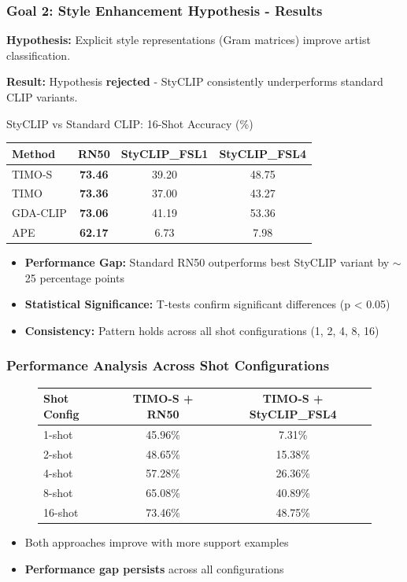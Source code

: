 \documentclass[aspectratio=169,xcolor=dvipsnames]{beamer}
\begin{document}
\begin{frame}
  \frametitle{Goal 2: Style Enhancement Hypothesis - Results}
  \textbf{Hypothesis:} Explicit style representations (Gram matrices) improve artist classification.
  
  \textbf{Result:} Hypothesis \textbf{rejected} - StyCLIP consistently underperforms standard CLIP variants.

  \begin{block}{StyCLIP vs Standard CLIP: 16-Shot Accuracy (\%)}
    \centering
    \tiny
    \begin{tabular}{@{}lccc@{}}
      \toprule
      \textbf{Method} & \textbf{RN50} & \textbf{StyCLIP\_FSL1} & \textbf{StyCLIP\_FSL4} \\
      \midrule
      TIMO-S    & \textbf{73.46} & 39.20 & 48.75 \\
      TIMO      & \textbf{73.36} & 37.00 & 43.27 \\
      GDA-CLIP  & \textbf{73.06} & 41.19 & 53.36 \\
      APE       & \textbf{62.17} & 6.73  & 7.98  \\
      \bottomrule
    \end{tabular}
    \normalsize
  \end{block}
  \begin{itemize}
    \item \textbf{Performance Gap:} Standard RN50 outperforms best StyCLIP variant by $\sim$25 percentage points
    \item \textbf{Statistical Significance:} T-tests confirm significant differences (p < 0.05)
    \item \textbf{Consistency:} Pattern holds across all shot configurations (1, 2, 4, 8, 16)
  \end{itemize}
\end{frame}

\begin{frame}
  \frametitle{Performance Analysis Across Shot Configurations}
  \begin{figure}[H]
    \centering
    \tiny
    \begin{tabular}{@{}lcc@{}}
      \toprule
      \textbf{Shot Config} & \textbf{TIMO-S + RN50} & \textbf{TIMO-S + StyCLIP\_FSL4} \\
      \midrule
      1-shot  & 45.96\% & 7.31\%  \\
      2-shot  & 48.65\% & 15.38\% \\
      4-shot  & 57.28\% & 26.36\% \\
      8-shot  & 65.08\% & 40.89\% \\
      16-shot & 73.46\% & 48.75\% \\
      \bottomrule
    \end{tabular}
  \end{figure}
    \begin{itemize}
    \item Both approaches improve with more support examples
    \item \textbf{Performance gap persists} across all configurations
  \end{itemize}
\end{frame}
\end{document}
